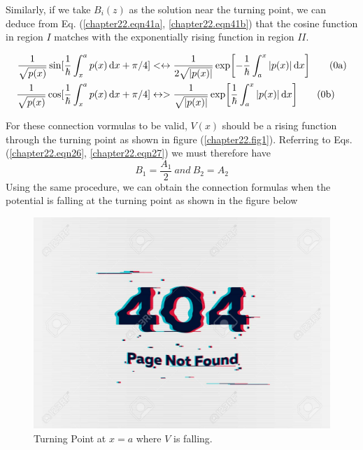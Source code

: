 Similarly, if we take $B_i(z)$ as the solution near the turning point, we can deduce from Eq. (\ref{chapter22.eqn41a}, \ref{chapter22.eqn41b}) that the cosine function in region $I$ matches with the exponentially rising function in region $II$.

\begin{align}
\frac{1}{\sqrt{p(x)}} \sin[\frac{1}{\hbar}\int_{x}^{a} p(x) \dd{x} + \pi/4] &<\leftrightarrow \frac{1}{2\sqrt{\abs{p(x)}}} \exp[-\frac{1}{\hbar}\int_{a}^{x} \abs{p(x)} \dd{x}]  \label{chapter22.eqn42a}
\tag{\theequation a} \\
\frac{1}{\sqrt{p(x)}} \cos[\frac{1}{\hbar}\int_{x}^{a} p(x) \dd{x} + \pi/4] &\leftrightarrow >
\frac{1}{\sqrt{\abs{p(x)}}} \exp[\frac{1}{\hbar}\int_{a}^{x} \abs{p(x)} \dd{x}]    \label{chapter22.eqn42b}
\tag{\theequation b} \\
\end{align}


For these connection vormulas to be valid, $V(x)$ should be a rising function  through the turning point as shown in figure (\ref{chapter22.fig1}). Referring to Eqs. (\ref{chapter22.eqn26}, \ref{chapter22.eqn27}) we must therefore have
\begin{equation}
B_1 = \frac{A_1}{2} \ and \ B_2 = A_2
\end{equation}
Using the same procedure, we can obtain the connection formulas when the potential is falling at the turning point as shown in the figure below


\begin{figure}
	\centering
	\includegraphics[width=0.5\linewidth]{Pictures/not-found.jpg}
	\caption{Turning Point at $x=a$ where $V$ is falling.}
	\label{chapter22.fig3}
\end{figure}


